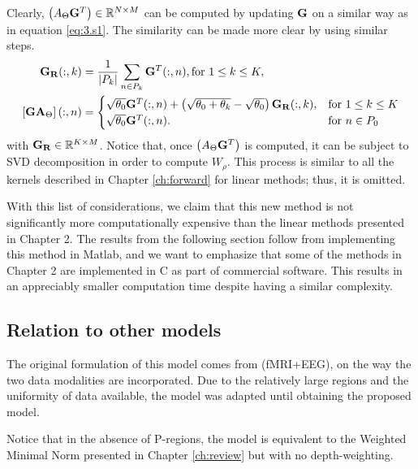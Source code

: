 Clearly, $\left( A_\Theta \mathbf{G}^T \right)\in \mathbb{R}^{N\times M}$ can be computed by updating $\mathbf{G}$ on a similar way as in equation \eqref{eq:3.s1}.
%
The similarity can be made more clear by using similar steps.
\begin{align}
    \mathbf{G}_{\mathbf{R}}(:,k) 
    &= 
    \frac{1}{\left| {P_k} \right|} \sum_{n \in P_k} \mathbf{G}^T(:, n), 
    \text{for } 1\leq k \leq K,
    \\
    \left[ \mathbf{G} \mathbf{A}_\Theta \right](:, n) 
    &=
    \begin{cases}
    \sqrt{\theta_0} \mathbf{G}^T(:,n) 
     + \left( \sqrt{\theta_0+\theta_k}-\sqrt{\theta_0} \right) \mathbf{G}_{\mathbf{R}}(:,k), &\text{for } 1\leq k \leq K \\
    \sqrt{\theta_0} \mathbf{G}^T(:,n).
    &\text{for } n\in P_0
    \end{cases}
\end{align}
with $\mathbf{G}_{\mathbf{R}} \in \mathbb{R}^{K\times M}$.
%
Notice that, once $\left( A_\Theta \mathbf{G}^T \right)$ is computed, it can be subject to 
SVD decomposition in order to compute $W_\rho$.
%
This process is similar to all the kernels described in Chapter \ref{ch:forward} for linear methods; thus, it is omitted.

With this list of considerations, we claim that this new method is not significantly more computationally expensive than the linear methods presented in Chapter 2.
%
The results from the following section follow from implementing this method in Matlab, and we want to emphasize that some of the methods in Chapter 2 are implemented in C as part of commercial software.
%
This results in an appreciably smaller computation time despite having a similar complexity.



\subsection{Relation to other models}

The original formulation of this model comes from (fMRI+EEG), on the way the two data modalities are incorporated.
%
Due to the relatively large regions and the uniformity of data available, the model was adapted until obtaining the proposed model.

Notice that in the absence of P-regions, the model is equivalent to the Weighted Minimal Norm presented in Chapter \ref{ch:review} but with no depth-weighting.

